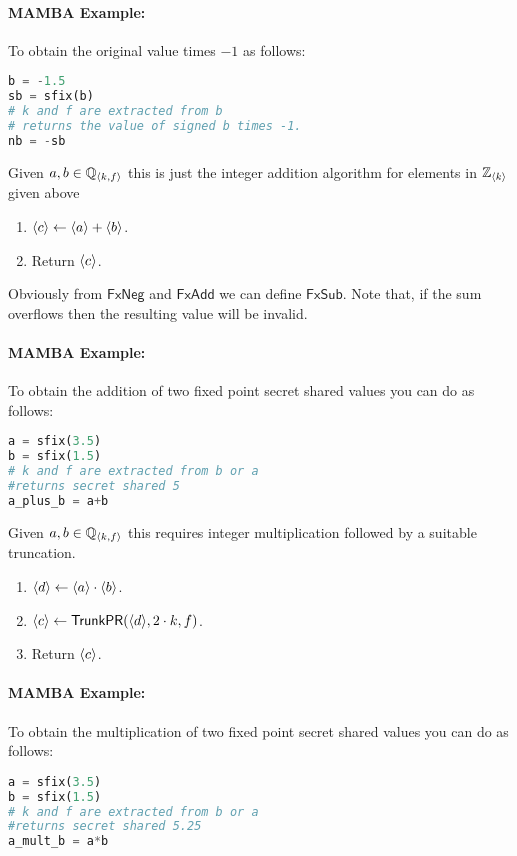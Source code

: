   \paragraph{MAMBA Example:} To obtain the original value times $-1$ as follows:
  \begin{lstlisting}[language={python}]
b = -1.5
sb = sfix(b)
# k and f are extracted from b
# returns the value of signed b times -1.
nb = -sb
\end{lstlisting}
  Given $a, b \in {\mathbb{Q}}_{\langle k, f \rangle}$ this is just the integer addition algorithm for elements
  in ${\mathbb{Z}}_{\langle k \rangle}$ given above
  \begin{enumerate}
    \item $\langle c \rangle \leftarrow \langle a \rangle + \langle b \rangle$.
    \item Return $\langle c \rangle$.
  \end{enumerate}
  Obviously from $\mathsf{FxNeg}$ and $\mathsf{FxAdd}$ we can define $\mathsf{FxSub}$.
  Note that, if the sum overflows then the resulting value will be
  invalid.
  \paragraph{MAMBA Example:} To obtain the addition of two fixed point secret shared values you can do as follows:
  \begin{lstlisting}[language={python}]
a = sfix(3.5)
b = sfix(1.5)
# k and f are extracted from b or a
#returns secret shared 5
a_plus_b = a+b
\end{lstlisting}
  Given $a, b \in {\mathbb{Q}}_{\langle k, f \rangle}$ this requires integer multiplication followed
  by a suitable truncation.
  \begin{enumerate}
    \item $\langle d \rangle \leftarrow \langle a \rangle \cdot \langle b \rangle$.
    \item $\langle c \rangle \leftarrow \mathsf{TrunkPR}(\langle d \rangle,2 \cdot k,f)$.
    \item Return $\langle c \rangle$.
  \end{enumerate}
  \paragraph{MAMBA Example:} To obtain the multiplication of two fixed point secret shared values you can do as follows:
  \begin{lstlisting}[language={python}]
a = sfix(3.5)
b = sfix(1.5)
# k and f are extracted from b or a
#returns secret shared 5.25
a_mult_b = a*b
\end{lstlisting}

